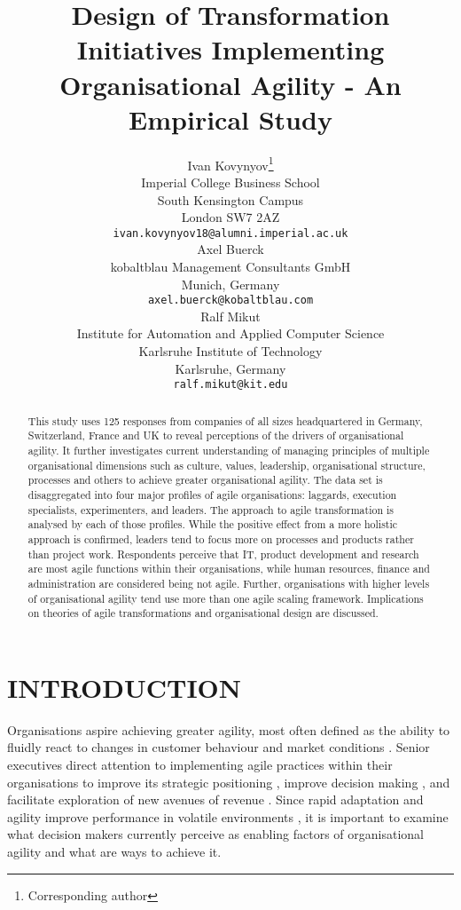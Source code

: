 \documentclass{article}
\title{Design of Transformation Initiatives Implementing Organisational Agility - An Empirical Study}
\author{
  Ivan Kovynyov\thanks{Corresponding author}
    \\
  Imperial College Business School\\
  South Kensington Campus \\
  London SW7 2AZ\\
  \texttt{ivan.kovynyov18@alumni.imperial.ac.uk} \\
   \And
   Axel Buerck \\
   kobaltblau Management Consultants GmbH\\
   Munich, Germany \\
   \texttt{axel.buerck@kobaltblau.com} \\
    \And
 Ralf Mikut \\
  Institute for Automation and Applied Computer Science\\
  Karlsruhe Institute of Technology\\
  Karlsruhe, Germany \\
  \texttt{ralf.mikut@kit.edu} \\
}
\newcommand{\myremark}[1]{{#1}}
\newcommand{\rmremark}[1]{\myremark{\color{red} [Ralf: #1]}}
\begin{document}
\maketitle


\begin{abstract}
This study uses 125 responses from companies of all sizes headquartered in Germany, Switzerland, France and UK to reveal perceptions of the drivers of organisational agility. It further investigates current understanding of managing principles of multiple organisational dimensions such as culture, values, leadership, organisational structure, processes and others to achieve greater organisational agility. The data set is disaggregated into four major profiles of agile organisations: laggards, execution specialists, experimenters, and leaders. The approach to agile transformation is analysed by each of those profiles. While the positive effect from a more holistic approach is confirmed, leaders tend to focus more on processes and products rather than project work. Respondents perceive that IT, product development and research are most agile functions within their organisations, while human resources, finance and administration are considered being not agile. Further, organisations with higher levels of organisational agility tend use more than one agile scaling framework. Implications on theories of agile transformations and organisational design are discussed.
\end{abstract}


\section{INTRODUCTION}

Organisations aspire achieving greater agility, most often defined as the ability to fluidly react to changes in customer behaviour and market conditions \cite{Overby2006, Keller2019, wendler2013}. Senior executives direct attention to implementing agile practices within their organisations to improve its strategic positioning \cite{kotter2012accelerate}, improve decision making \cite{rigby2020}, and facilitate exploration of new avenues of revenue \cite{ghezzi2018agile}. Since rapid adaptation and agility improve performance in volatile environments \cite{rafique2018, drury2014}, it is important to examine what decision makers currently perceive as enabling factors of organisational agility and what are ways to achieve it.
\end{document}
